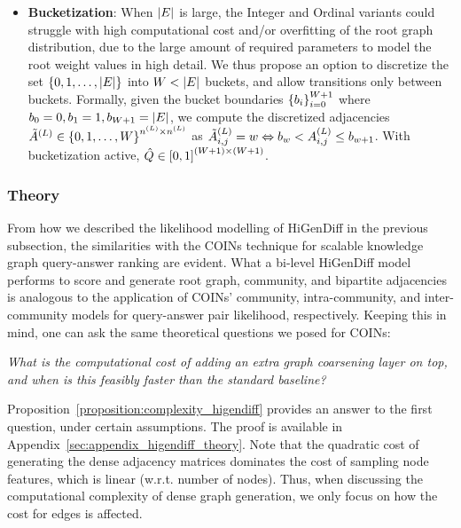 \begin{itemize}
    The ordinal setting acknowledges this and modifies $\hat{Q} \in \off{0,1}^{\of{\abs{E}+1} \times \of{\abs{E}+1}}$ to be \enquote{Markov-like} and allow only transitions to neighbouring integers on the number line: 
    \begin{equation}
        \hat{Q}_{i,j}\propto\begin{cases}
            \hat{p}_j, & \abs{i-j}\leq 1 \\
            0, & \text{otherwise}
        \end{cases}
    \end{equation}
    \item \textbf{Bucketization}: When $\mathopen{}\left|E\right|$ is large, the Integer and Ordinal variants could struggle with high computational cost and/or overfitting of the root graph distribution, due to the large amount of required parameters to model the root weight values in high detail. We thus propose an option to discretize the set $\mathopen{}\left\{0,1,\dots,\mathopen{}\left|E\right|\right\}$ into $W<\mathopen{}\left|E\right|$ buckets, and allow transitions only between buckets. Formally, given the bucket boundaries $\mathopen{}\left\{b_i\right\}_{i=0}^{W+1}$ where $b_0=0,b_1=1,b_{W+1}=\mathopen{}\left|E\right|$, we compute the discretized adjacencies $\tilde{A}^{\mathopen{}\left(L\right)} \in \mathopen{}\left\{0,1,\dots,W\right\}^{n^{\mathopen{}\left(L\right)} \times n^{\mathopen{}\left(L\right)}}$ as $\tilde{A}_{i,j}^{\mathopen{}\left(L\right)}=w \Leftrightarrow b_w < A_{i,j}^{\mathopen{}\left(L\right)} \leq  b_{w+1}$. With bucketization active, $\hat{Q} \in \mathopen{}\left[0,1\right]^{\mathopen{}\left(W+1\right) \times \mathopen{}\left(W+1\right)}$.
\end{itemize}

\subsubsection{Theory}
From how we described the likelihood modelling of HiGenDiff in the previous subsection, the similarities with the COINs technique for scalable knowledge graph query-answer ranking are evident. What a bi-level HiGenDiff model performs to score and generate root graph, community, and bipartite adjacencies is analogous to the application of COINs' community, intra-community, and inter-community models for query-answer pair likelihood, respectively. Keeping this in mind, one can ask the same theoretical questions we posed for COINs: 
\begin{center}
    \emph{What is the computational cost of adding an extra graph coarsening layer on top, and when is this feasibly faster than the standard baseline?}
\end{center}
Proposition~\ref{proposition:complexity_higendiff} provides an answer to the first question, under certain assumptions. The proof is available in Appendix~\ref{sec:appendix_higendiff_theory}. Note that the quadratic cost of generating the dense adjacency matrices dominates the cost of sampling node features, which is linear (w.r.t. number of nodes). Thus, when discussing the computational complexity of dense graph generation, we only focus on how the cost for edges is affected.

